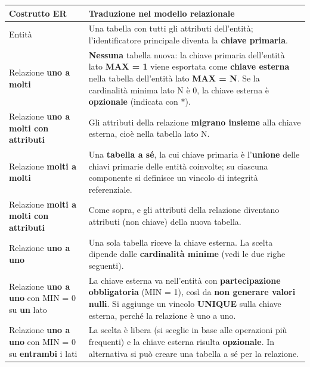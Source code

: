 \documentclass[a4paper,twoside]{article}
\begin{document}
\begin{table}[H]
  \centering
  \small
  \begin{tabular}{@{}p{}p{}@{}}
    \toprule
    \textbf{Costrutto ER} & \textbf{Traduzione nel modello relazionale} \\
    \midrule
    Entità
      & Una tabella con tutti gli attributi dell'entità; l'identificatore principale
        diventa la \textbf{chiave primaria}. \\
    \addlinespace
    Relazione \textbf{uno a molti}
      & \textbf{Nessuna} tabella nuova: la chiave primaria dell'entità lato
        \textbf{MAX = 1} viene esportata come \textbf{chiave esterna} nella tabella
        dell'entità lato \textbf{MAX = N}. Se la cardinalità minima lato N è 0, la
        chiave esterna è \textbf{opzionale} (indicata con \( * \)). \\
    \addlinespace
    Relazione \textbf{uno a molti con attributi}
      & Gli attributi della relazione \textbf{migrano insieme} alla chiave esterna,
        cioè nella tabella lato N. \\
    \addlinespace
    Relazione \textbf{molti a molti}
      & Una \textbf{tabella a sé}, la cui chiave primaria è l'\textbf{unione} delle
        chiavi primarie delle entità coinvolte; su ciascuna componente si definisce un
        vincolo di integrità referenziale. \\
    \addlinespace
    Relazione \textbf{molti a molti con attributi}
      & Come sopra, e gli attributi della relazione diventano attributi (non chiave)
        della nuova tabella. \\
    \addlinespace
    Relazione \textbf{uno a uno}
      & Una sola tabella riceve la chiave esterna. La scelta dipende dalle
        \textbf{cardinalità minime} (vedi le due righe seguenti). \\
    \addlinespace
    Relazione \textbf{uno a uno} con MIN = 0 su \textbf{un} lato
      & La chiave esterna va nell'entità con \textbf{partecipazione obbligatoria}
        (MIN = 1), così da \textbf{non generare valori nulli}. Si aggiunge un vincolo
        \textbf{UNIQUE} sulla chiave esterna, perché la relazione è uno a uno. \\
    \addlinespace
    Relazione \textbf{uno a uno} con MIN = 0 su \textbf{entrambi} i lati
      & La scelta è libera (si sceglie in base alle operazioni più frequenti) e la
        chiave esterna risulta \textbf{opzionale}. In alternativa si può creare una
        tabella a sé per la relazione. \\

\end{tabular}
\end{table}
\end{document}
